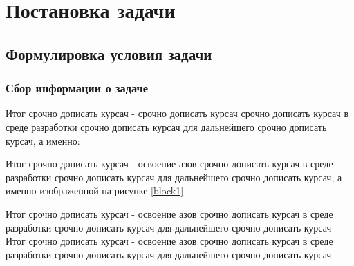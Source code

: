 







\section{Постановка задачи}
\subsection{Формулировка условия задачи}
\subsubsection{Сбор информации о задаче}

Итог срочно дописать курсач - срочно дописать курсач срочно дописать курсач в среде разработки срочно дописать курсач для дальнейшего срочно дописать курсач, а именно:



Итог срочно дописать курсач - освоение азов срочно дописать курсач в среде разработки срочно дописать курсач для дальнейшего срочно дописать курсач, а именно изображенной
на рисунке \ref{block1}

\liststartletter
{}
\liststart
{}
\listend
{}
\listend

Итог срочно дописать курсач - освоение азов срочно дописать курсач в среде разработки срочно дописать курсач для дальнейшего срочно дописать курсач
\liststartdash
{}
\liststart
{}
\listend
\listend
Итог срочно дописать курсач - освоение азов срочно дописать курсач в среде разработки срочно дописать курсач для дальнейшего срочно дописать курсач

